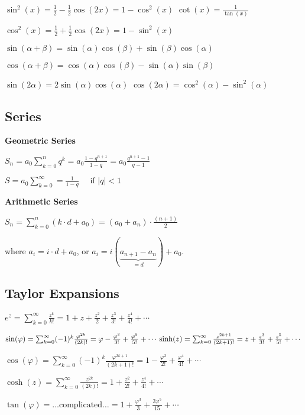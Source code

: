 \documentclass[a4paper,11pt]{extarticle}
\newcommand{\abs}[1]{\left\lvert #1 \right\rvert}
\begin{document}
\begin{multicols*}{2}
$
\sin^2(x) = \frac{1}{2} - \frac{1}{2}\cos(2x) = 1 - \cos^2(x)
$
\qquad
$
\cot(x) = \frac{1}{\tan(x)}
$

$
\cos^2(x) = \frac{1}{2} + \frac{1}{2}\cos(2x) = 1 - \sin^2(x)
$

$
\sin(\alpha + \beta) = \sin(\alpha)\cos(\beta) + \sin(\beta)\cos(\alpha)
$

$
\cos(\alpha + \beta) = \cos(\alpha)\cos(\beta) - \sin(\alpha)\sin(\beta)
$

$
\sin(2\alpha) = 2\sin(\alpha)\cos(\alpha)
$
\qquad
$
\cos(2\alpha) = \cos^2(\alpha) - \sin^2(\alpha)
$

\subsection{Series}

\textbf{Geometric Series}

$
S_n = a_0\sum_{k=0}^n q^k = a_0\frac{1-q^{n+1}}{1-q} = a_0 \frac{q^{n+1}-1}{q-1}
$

$
S = a_0\sum_{k=0}^\infty = \frac{1}{1-q} \quad \text{ if } \abs{q}<1
$

\textbf{Arithmetic Series}

$
S_n = \sum_{k=0}^{n}\left(k\cdot d + a_0\right)= (a_0+a_n) \cdot \frac{(n+1)}{2}
$

where
$
a_i = i\cdot d + a_0
$, or $
a_i = i(\underbrace{a_{n+1}-a_n}_{=d}) + a_0.
$

\subsection{Taylor Expansions}

$
e^z	      
= \sum_{k=0}^{\infty} \frac{z^k}{k!} 
= 1 + z + \frac{z^2}{2}+\frac{z^3}{3!}+\frac{z^4}{4!}+\cdots
$

$
\sin(\varphi)  
=\sum_{k=0}^{\infty} (-1)^k \frac{\varphi^{2k}}{(2k)!}
= \varphi - \frac{\varphi^3}{3!} + \frac{\varphi^5}{5!}+\cdots
\\
\sinh(z)
= \sum_{k=0}^{\infty} \frac{z^{2k+1}}{(2k+1)!}
= z + \frac{z^3}{3!} + \frac{z^5}{5!}+\cdots
$

$
\cos(\varphi)  
= \sum_{k=0}^{\infty} (-1)^k \frac{\varphi^{2k+1}}{(2k+1)!}
= 1 - \frac{\varphi^2}{2!} + \frac{\varphi^4}{4!}+\cdots
$

$
\cosh(z)
=
\sum_{k=0}^\infty \frac{z^{2k}}{(2k)!}
= 1 + \frac{z^2}{2!} + \frac{z^4}{4!}+\cdots
$

$
\tan(\varphi)  
= \ldots \text{complicated} \ldots
= 1 + \frac{\varphi^3}{3} + \frac{2\varphi^5}{15}+\cdots
$


\end{multicols*}
\end{document}
